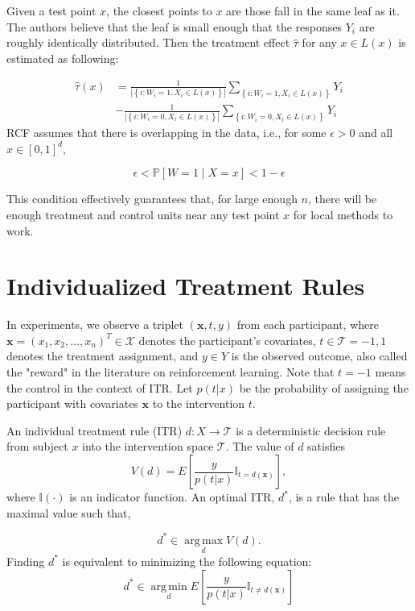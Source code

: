 \documentclass{article}
\begin{document}
Given a test point $x$, the closest points to $x$ are those fall in the same
leaf as it. The authors believe that the leaf is small enough that the
responses $Y_i$ are roughly identically distributed. Then the
treatment effect $\hat{\tau}$ for any $x \in L(x)$ is estimated as
following:

\begin{align*}
\hat{\tau}(x) & = \frac{1}{\left | \left \{ i: W_i=1, X_i \in L(x) \right \}
  \right |} \sum_{\left \{ i: W_i = 1, X_i \in L(x) \right \}} Y_i \\ & - \frac{1}{\left | \left \{ i: W_i=0, X_i \in L(x) \right \}
  \right |} \sum_{\left \{ i: W_i = 0, X_i \in L(x) \right \}} Y_i
\end{align*}
RCF assumes that
there is overlapping in the data, i.e., for some $\epsilon > 0$ and
all $x \in \left [ 0, 1\right ]^d$,

$$\epsilon < \mathbb{P}\left [ W=1 \mid X=x \right ] < 1-\epsilon$$

This condition effectively guarantees that, for large enough $n$,
there will be enough treatment and control units near any test point
$x$ for local methods to work.

\section{Individualized Treatment Rules}
In experiments, we observe a triplet $(\mathbf{x}, t, y)$ from each
participant, where $\mathbf{x}=(x_1, x_2, \ldots, x_n)^T \in
\mathcal{X}$ denotes the participant's covariates, $t \in \mathcal{T}
= {-1,1}$ denotes the treatment assignment, and $y \in Y$ is the
observed outcome, also called the "reward" in the literature on
reinforcement learning. Note that $t=-1$ means the control in the
context of ITR. Let $p(t|x)$ be the probability of assigning the participant
with covariates $\mathbf{x}$ to the intervention $t$.

An individual treatment rule (ITR) $d: X \rightarrow \mathcal{T}$ is a deterministic decision
rule from subject $x$ into the intervention space $\mathcal{T}$. The
value of $d$ satisfies
$$V(d) = E \left [ \frac{y}{p(t|x)}\mathbb{I}_{t=d(\mathbf{x})}\right
],$$
where $\mathbb{I}(\cdot)$ is an indicator function. An optimal ITR, $d^{*}$, is a rule that has the maximal value such
that,

$$d^{*} \in \operatorname*{arg\,max}_d V(d).$$
Finding $d^{*}$ is equivalent to minimizing the following equation:
\begin{equation} \label{eq:d_min}
d^{*} \in \operatorname*{arg\,min}_d E \left [
  \frac{y}{p(t|x)}\mathbb{I}_{t \neq d(\mathbf{x})}\right
]
\end{equation}
\end{document}
